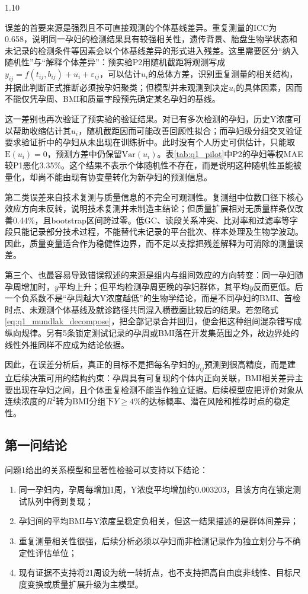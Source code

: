 \documentclass[12pt,a4paper]{ctexrep}
\numberwithin{equation}{section}
\begin{document}
\begin{spacing}{1.10}
{			误差的首要来源是强烈且不可直接观测的个体基线差异。重复测量的ICC为0.658，说明同一孕妇的检测结果具有较强相关性，遗传背景、胎盘生物学状态和未记录的检测条件等因素会以个体基线差异的形式进入残差。这里需要区分“纳入随机性”与“解释个体差异”：预实验P2用随机截距将观测写成$y_{ij}=f(t_{ij},b_{ij})+u_i+\varepsilon_{ij}$，可以估计$u_i$的总体方差，识别重复测量的相关结构，并据此判断正式推断必须按孕妇聚类；但模型并未观测到决定$u_i$的具体因素，因而不能仅凭孕周、BMI和质量字段预先确定某名孕妇的基线。

			这一差别也再次验证了预实验的验证结果。对已有多次检测的孕妇，历史Y浓度可以帮助收缩估计其$u_i$，随机截距因而可能改善回顾性拟合；而孕妇级分组交叉验证要求验证折中的孕妇从未出现在训练折中。此时没有个人历史可供估计，只能取$\mathrm E(u_i)=0$，预测方差中仍保留$\mathrm{Var}(u_i)$。表\ref{tab:q1_pilot}中P2的孕妇等权MAE较P1恶化3.35\%。这个结果不表示个体随机性不存在，而是说明这种随机性虽能被量化，却尚不能由现有协变量转化为新孕妇的预测信息。

			第二类误差来自技术复测与质量信息的不完全可观测性。复测组中位数口径下核心效应方向未反转，说明技术复测并未制造主结论；但质量扩展相对无质量样条仅改善0.44\%，且bootstrap区间跨过零。低GC、读段关系冲突、比对率和过滤率等字段只能记录部分技术过程，不能替代未记录的平台批次、样本处理及生物学波动。因此，质量变量适合作为稳健性边界，而不足以支撑把残差解释为可消除的测量误差。

			第三个、也最容易导致错误叙述的来源是组内与组间效应的方向转变：同一孕妇随孕周增加时，$y$平均上升；但平均检测孕周更晚的孕妇群体，其平均$y$反而更低。后一个负系数不是“孕周越大Y浓度越低”的生物学结论，而是不同孕妇的BMI、首检时点、未观测个体基线及就诊路径共同混入横截面比较后的结果。若忽略式\eqref{eq:q1_mundlak_decompose}，把全部记录合并回归，便会把这种组间混杂错写成纵向规律。另有5条锁定测试记录的孕周或BMI落在开发集范围之外，故边界处的线性外推同样不应成为结论依据。

			因此，在误差分析后，真正的目标不是把每名孕妇的$y_{ij}$预测到很高精度，而是建立后续决策可用的结构约束：孕周具有可复现的个体内正向关联，BMI相关差异主要出现在孕妇之间，且个体重复检测不能当作独立证据。后续模型应把评价对象从连续浓度的$R^2$转为BMI分组下$Y\geq4\%$的达标概率、潜在风险和推荐时点的稳定性。
			
			\subsection{第一问结论}
			问题1给出的关系模型和显著性检验可以支持以下结论：
			\begin{enumerate}[leftmargin=2em,itemsep=2pt]
			\item 同一孕妇内，孕周每增加1周，Y浓度平均增加约0.003203，且该方向在锁定测试队列中得到复现；
			\item 孕妇间的平均BMI与Y浓度呈稳定负相关，但这一结果描述的是群体间差异；
			\item 重复测量相关性很强，后续分析必须以孕妇而非检测记录作为独立划分与不确定性评估单位；
			\item 现有证据不支持将21周设为统一转折点，也不支持把高自由度非线性、目标尺度变换或质量扩展升级为主模型。
			\end{enumerate}

}
\end{spacing}
\end{document}
